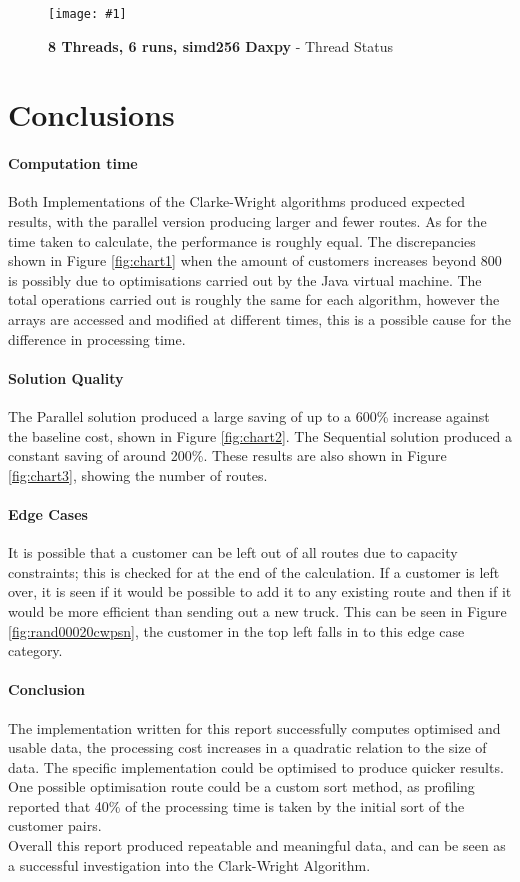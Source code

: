 \documentclass[conference]{acmsiggraph}
\newcommand{\figuremacroF}[4]{
	\begin{figure*}[t] %
		\centering
		\texttt{[image: \#1]}
		\caption[#2]{\textbf{#2} - #3}
		\label{fig:#1}
	\end{figure*}
}
\begin{document}
\figuremacroF
{t8i8simd256conp}
{8 Threads, 6 runs, simd256 Daxpy}
{Thread Status}
{1.0}


\section{Conclusions}
\paragraph{Computation time}
Both Implementations of the Clarke-Wright algorithms produced expected results, with the parallel version producing larger and fewer routes. As for the time taken to calculate, the performance is roughly equal.
The discrepancies shown in Figure \ref{fig:chart1} when the amount of customers increases beyond 800 is possibly due to optimisations carried out by the Java virtual machine. The total operations carried out is roughly the same for each algorithm, however the arrays are accessed and modified at different times, this is a possible cause for the difference in processing time.

\paragraph{Solution Quality}
The Parallel solution produced a large saving of up to a 600\% increase against the baseline cost, shown in Figure \ref{fig:chart2}. The Sequential solution produced a constant saving of around 200\%. These results are also shown in Figure \ref{fig:chart3}, showing the number of routes.

\paragraph{Edge Cases}
It is possible that a customer can be left out of all routes due to capacity constraints; this is checked for at the end of the calculation. If a customer is left over, it is seen if it would be possible to add it to any existing route and then if it would be more efficient than sending out a new truck. This can be seen in Figure \ref{fig:rand00020cwpsn}, the customer in the top left falls in to this edge case category.

\paragraph{Conclusion}
The implementation written for this report successfully computes optimised and usable data, the processing cost increases in a quadratic relation to the size of data. The specific implementation could be optimised to produce quicker results. One possible optimisation route could be a custom sort method, as profiling reported that 40\% of the processing time is taken by the initial sort of the customer pairs.\\
Overall this report produced repeatable and meaningful data, and can be seen as a successful investigation into the Clark-Wright Algorithm.


\clearpage
\end{document}
